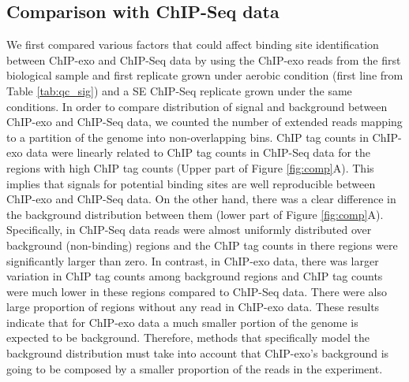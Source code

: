 \documentclass{bmcart}\usepackage[]{graphicx}\usepackage[]{color}
\begin{document}

\subsection*{Comparison with ChIP-Seq data}

We first compared various factors that could affect binding site
identification between ChIP-exo and ChIP-Seq data by using the
ChIP-exo reads from the first biological sample and first replicate
grown under aerobic condition (first line from Table \ref{tab:qc_sig})
and a SE ChIP-Seq replicate grown under the same conditions. In order
to compare distribution of signal and background between ChIP-exo and
ChIP-Seq data, we counted the number of extended reads mapping to a
partition of the genome into non-overlapping bins. ChIP tag counts in
ChIP-exo data were linearly related to ChIP tag counts in ChIP-Seq
data for the regions with high ChIP tag counts (Upper part of Figure
\ref{fig:comp}A). This implies that signals for potential binding
sites are well reproducible between ChIP-exo and ChIP-Seq data. On the
other hand, there was a clear difference in the background
distribution between them (lower part of Figure
\ref{fig:comp}A). Specifically, in ChIP-Seq data reads were almost
uniformly distributed over background (non-binding) regions and the
ChIP tag counts in there regions were significantly larger than
zero. In contrast, in ChIP-exo data, there was larger variation in
ChIP tag counts among background regions and ChIP tag counts were much
lower in these regions compared to ChIP-Seq data. There were also
large proportion of regions without any read in ChIP-exo data. These
results indicate that for ChIP-exo data a much smaller portion of the
genome is expected to be background. Therefore, methods that
specifically model the background distribution must take into account
that ChIP-exo's background is going to be composed by a smaller
proportion of the reads in the experiment.
\end{document}
